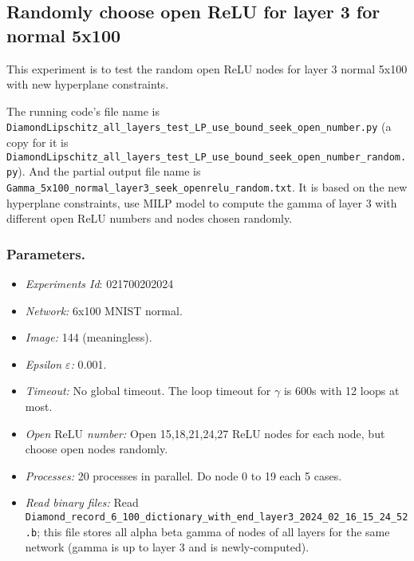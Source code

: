 \documentclass{llncs}
\newcommand{\ReLU}{\mathrm{ReLU}}
\begin{document}
\subsection{Randomly choose open ReLU for layer 3 for normal 5x100}

This experiment is to test the random open ReLU nodes for layer 3 normal 5x100 with new hyperplane constraints.

\vspace*{1ex}

The running code's file name is \verb*|DiamondLipschitz_all_layers_test_LP_use_bound_seek_open_number.py| (a copy for it is \verb*|DiamondLipschitz_all_layers_test_LP_use_bound_seek_open_number_random.py|). And the partial output file name is \verb*|Gamma_5x100_normal_layer3_seek_openrelu_random.txt|.  It is based on the new hyperplane constraints, use MILP model to compute the gamma of layer 3 with different open ReLU numbers and nodes chosen randomly.

\subsubsection*{Parameters.}

\begin{itemize}
	\item\emph{Experiments Id}: 021700202024
	
	\item\emph{Network:} 6x100 MNIST normal. 
	
	\item\emph{Image:} 144 (meaningless).
	
	\item\emph{Epsilon $\varepsilon$:} 0.001.
	
	\item\emph{Timeout:} No global timeout. The loop timeout for $\gamma$ is 600s with 12 loops at most.
	
	\item\emph{Open $\ReLU$ number:} Open 15,18,21,24,27 ReLU nodes for each node, but choose open nodes randomly.
	
	\item\emph{Processes:} 20 processes in parallel. Do node 0 to 19 each 5 cases.
	
	\item\emph{Read binary files:} Read \verb*|Diamond_record_6_100_dictionary_with_end_layer3_2024_02_16_15_24_52.b|; this file stores all alpha beta gamma of nodes of all layers for the same network (gamma is up to layer 3 and is newly-computed). 
\end{itemize}
\end{document}
